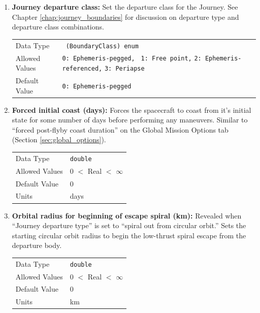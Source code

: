 \begin{enumerate}
    \item \textbf{Journey departure class:} Set the departure class for the Journey. See Chapter \ref{chap:journey_boundaries} for discussion on departure type and departure class combinations.
    
        \begin{table}[H]
            \hspace{2cm}
            \begin{tabular}{lp{3cm}}
            Data Type & \verb| (BoundaryClass) enum| \\
            Allowed Values & \verb|0: Ephemeris-pegged, |\newline
            \verb|1: Free point,| \newline 
            \verb|2: Ephemeris-referenced,|\newline 
            \verb|3: Periapse| \\
            Default Value & \verb|0: Ephemeris-pegged|\\
            \end{tabular}
        \end{table}

    \item \textbf{Forced initial coast (days):} Forces the spacecraft to coast from it's initial state for some number of days before performing any maneuvers. Similar to ``forced post-flyby coast duration'' on the Global Mission Options tab (Section \ref{sec:global_options}). 
        
        \begin{table}[H]
            \hspace{2cm}
            \begin{tabular}{ll}
            Data Type & \verb|double| \\
            Allowed Values & 0 $<$ Real $<$ $\infty$ \\
            Default Value & 0 \\
            Units & days 
            \end{tabular}
        \end{table}

    \item \textbf{Orbital radius for beginning of escape spiral (km):} Revealed when ``Journey departure type'' is set to ``spiral out from circular orbit.'' Sets the starting circular orbit radius to begin the low-thrust spiral escape from the departure body.
        
        \begin{table}[H]
            \hspace{2cm}
            \begin{tabular}{ll}
            Data Type & \verb|double| \\
            Allowed Values & 0 $<$ Real $<$ $\infty$ \\
            Default Value & 0 \\
            Units & km 
            \end{tabular}
        \end{table}


\end{enumerate}
